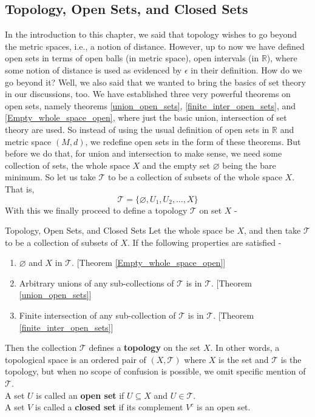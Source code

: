 \subsection{Topology, Open Sets, and Closed Sets}
In the introduction to this chapter, we said that topology wishes to go beyond the metric spaces, i.e., a notion of distance. However, up to now we have defined open sets in terms of open balls (in metric space), open intervals (in $\mathbb{R}$), where some notion of distance is used as evidenced by $\epsilon$ in their definition. How do we go beyond it? Well, we also said that we wanted to bring the basics of set theory in our discussions, too. We have established three very powerful theorems on open sets, namely theorems \eqref{union_open_sets}, \eqref{finite_inter_open_sets}, and \eqref{Empty_whole_space_open}, where just the basic union, intersection of set theory are used. So instead of using the usual definition of open sets in $\mathbb{R}$ and metric space $(M,d)$, we redefine open sets in the form of these theorems. But before we do that, for union and intersection to make sense, we need some collection of sets, the whole space $X$ and the empty set $\varnothing$ being the bare minimum. So let us take $\mathcal{T}$ to be a collection of subsets of the whole space $X$. That is, $$\mathcal{T}=\{\varnothing,U_1,U_2,\dots,X\}$$
With this we finally proceed to define a topology $\mathcal{T}$ on set $X$ -
\begin{Definition}{Topology, Open Sets, and Closed Sets}\label{topology_open_sets_closed set}
    Let the whole space be $X$, and then take $\mathcal{T}$ to be a collection of subsets of $X$. If the following properties are satisfied -
    \begin{enumerate}
        \item $\varnothing$ and $X$ in $\mathcal{T}$. [Theorem \eqref{Empty_whole_space_open}]
        \item Arbitrary unions of any sub-collections of $\mathcal{T}$ is in $\mathcal{T}$. [Theorem \eqref{union_open_sets}]
        \item Finite intersection of any sub-collection of $\mathcal{T}$ is in $\mathcal{T}$. [Theorem \eqref{finite_inter_open_sets}]
    \end{enumerate}
    Then the collection $\mathcal{T}$ defines a \textbf{topology} on the set $X$. In other words, a topological space is an ordered pair of $(X,\mathcal{T})$ where $X$ is the set and $\mathcal{T}$ is the topology, but when no scope of confusion is possible, we omit specific mention of $\mathcal{T}$.\\
    A set $U$ is called an \textbf{open set} if $U\subseteq X$ and $U\in\mathcal{T}$.\\
    A set $V$ is called a \textbf{closed set} if its complement $V^c$ is an open set.
\end{Definition}

